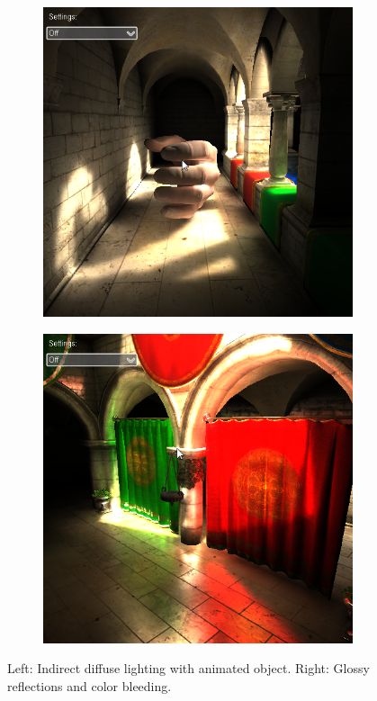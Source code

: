 \begin{figure}
\begin{center}
	\begin{subfigure}[b]{0.48\textwidth}
		\includegraphics[width=1.0\textwidth]{graphics/vct/vct-14-2}
	\end{subfigure}
	\begin{subfigure}[b]{0.48\textwidth}
		\includegraphics[width=1.0\textwidth]{graphics/vct/vct-14-3}
	\end{subfigure}
\end{center}
	\caption{Left: Indirect diffuse lighting with animated object. Right: Glossy reflections and color bleeding.}
	\label{f:vct-indirect}
\end{figure}




